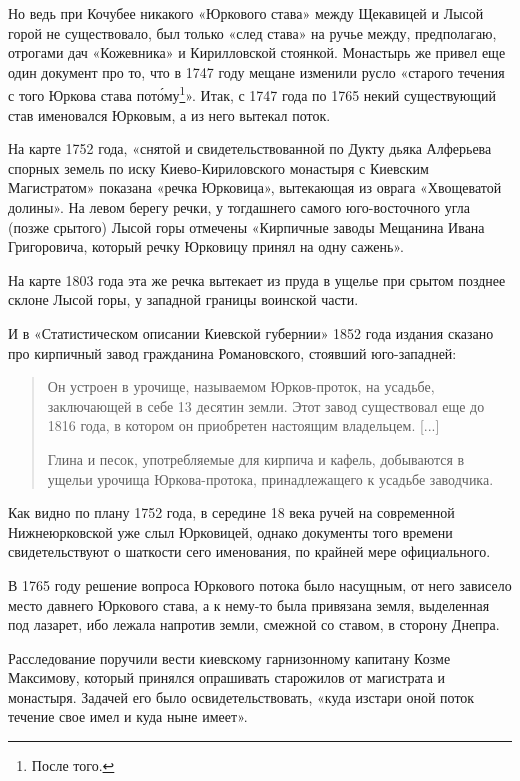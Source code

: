 Но ведь при Кочубее никакого «Юркового става» между Щекавицей и Лысой горой не существовало, был только «след става» на ручье между, предполагаю, отрогами дач «Кожевника» и Кирилловской стоянкой. Монастырь же привел еще один документ про то, что в 1747 году мещане изменили русло «старого течения с того Юркова става пот\'ому\footnote{После того.}». Итак, с 1747 года по 1765 некий существующий став именовался Юрковым, а из него вытекал поток.

На карте 1752 года, «снятой и свидетельствованной по Дукту дьяка Алферьева спорных земель по иску Киево-Кириловского монастыря с Киевским Магистратом» показана «речка Юрковица», вытекающая из оврага «Хвощеватой долины». На левом берегу речки, у тогдашнего самого юго-восточ\-ного угла (позже срытого) Лысой горы отмечены «Кирпичные заводы Мещанина Ивана Григоровича, который речку Юрковицу принял на одну сажень».

На карте 1803 года эта же речка вытекает из пруда в ущелье при срытом позднее склоне Лысой горы, у западной границы воинской части. %

И в «Статистическом описании Киевской губернии» 1852 года издания\cite{fundstat} сказано про кирпичный завод гражданина Романовского, стоявший юго-западней:

\begin{quotation}
Он устроен в урочище, называемом Юрков-проток, на усадьбе, заключающей в себе 13 десятин земли. Этот завод существовал еще до 1816 года, в котором он приобретен настоящим владельцем. [...]

Глина и песок, употребляемые для кирпича и кафель, добываются в ущельи урочища Юркова-протока, принадлежащего к усадьбе заводчика.
\end{quotation}

Как видно по плану 1752 года, в середине 18 века  ручей на современной Нижнеюрковской уже слыл  Юрковицей, однако документы того времени свидетельствуют о шаткости сего именования, по крайней мере официального.

В 1765 году решение вопроса Юркового потока было насущным, от него зависело место давнего Юркового става, а к нему-то была привязана земля, выделенная под лазарет, ибо лежала напротив земли, смежной со ставом, в сторону Днепра.

Расследование поручили вести киевскому гарнизонному капитану Козме Максимову, который принялся опрашивать старожилов от магистрата и монастыря. Задачей его было освидетельствовать, «куда изстари оной поток течение свое имел и куда ныне имеет».

